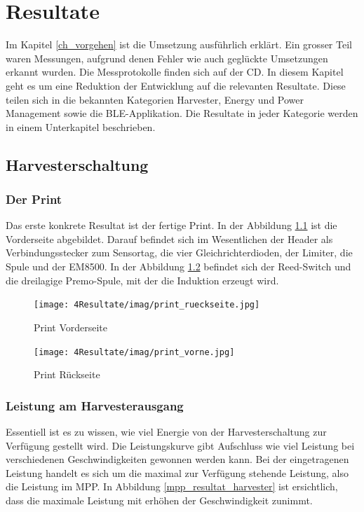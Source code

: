 \chapter{Resultate}
\label{ch_resultat}

Im Kapitel \ref{ch_vorgehen} ist die Umsetzung ausführlich erklärt. Ein grosser Teil waren Messungen, aufgrund denen Fehler wie auch geglückte Umsetzungen erkannt wurden. Die Messprotokolle  finden sich auf der CD. In diesem Kapitel geht es um eine Reduktion der Entwicklung auf die relevanten Resultate. Diese teilen sich in die bekannten Kategorien Harvester, Energy und Power Management sowie die BLE-Applikation. Die Resultate in jeder Kategorie werden in einem Unterkapitel beschrieben.
 
\section{Harvesterschaltung}

\subsection{Der Print}

Das erste konkrete Resultat ist der fertige Print. In der Abbildung \ref{print_vorne} ist die Vorderseite abgebildet.  Darauf befindet sich im Wesentlichen der Header als Verbindungsstecker zum Sensortag, die vier Gleichrichterdioden, der Limiter, die Spule und der EM8500. In der Abbildung \ref{print_rueckseite} befindet sich der Reed-Switch und die dreilagige Premo-Spule, mit der die Induktion erzeugt wird.

\begin{figure}[ht]
    \texttt{[image: 4Resultate/imag/print\_rueckseite.jpg]} 
    \caption{Print Vorderseite}
    \label{print_vorne}
\end{figure}


\begin{figure}[ht]
    \texttt{[image: 4Resultate/imag/print\_vorne.jpg]} 
    \caption{Print Rückseite}
    \label{print_rueckseite}
\end{figure}


\subsection{Leistung am Harvesterausgang}

Essentiell ist es zu wissen, wie viel Energie von der Harvesterschaltung zur Verfügung gestellt wird. Die Leistungskurve gibt Aufschluss wie viel Leistung bei verschiedenen Geschwindigkeiten gewonnen werden kann. Bei der eingetragenen Leistung handelt es sich um die maximal zur Verfügung stehende Leistung, also die Leistung im MPP. In Abbildung \ref{mpp_resultat_harvester} ist ersichtlich, dass die maximale Leistung mit erhöhen der Geschwindigkeit zunimmt.

